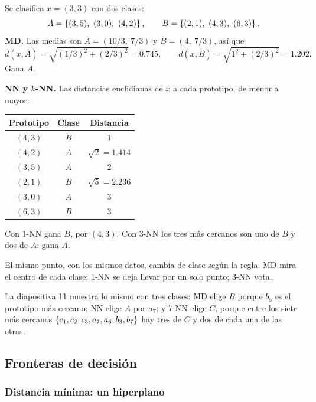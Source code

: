\documentclass[11pt,letterpaper]{article}
\begin{document}
\begin{ejemplo}
    Se clasifica $x = (3, 3)$ con dos clases:
    \[
        A = \set{(3, 5),\ (3, 0),\ (4, 2)} , \qquad
        B = \set{(2, 1),\ (4, 3),\ (6, 3)} .
    \]
    \textbf{MD.} Las medias son $\bar{A} = (10/3,\ 7/3)$ y
    $\bar{B} = (4,\ 7/3)$, así que
    \[
        d(x, \bar{A}) = \sqrt{(1/3)^2 + (2/3)^2} = 0.745 , \qquad
        d(x, \bar{B}) = \sqrt{1^2 + (2/3)^2} = 1.202 .
    \]
    Gana $A$.

    \textbf{NN y $k$-NN.} Las distancias euclidianas de $x$ a cada
    prototipo, de menor a mayor:
    \begin{center}
    \begin{tabular}{ccc}
        \toprule
        \textbf{Prototipo} & \textbf{Clase} & \textbf{Distancia} \\
        \midrule
        $(4, 3)$ & $B$ & $1$ \\
        $(4, 2)$ & $A$ & $\sqrt{2} = 1.414$ \\
        $(3, 5)$ & $A$ & $2$ \\
        $(2, 1)$ & $B$ & $\sqrt{5} = 2.236$ \\
        $(3, 0)$ & $A$ & $3$ \\
        $(6, 3)$ & $B$ & $3$ \\
        \bottomrule
    \end{tabular}
    \end{center}
    Con 1-NN gana $B$, por $(4, 3)$. Con 3-NN los tres más cercanos
    son uno de $B$ y dos de $A$: gana $A$.

    El mismo punto, con los mismos datos, cambia de clase según la
    regla. MD mira el centro de cada clase; 1-NN se deja llevar por un
    solo punto; 3-NN vota.
\end{ejemplo}

La diapositiva 11 muestra lo mismo con tres clases: MD elige $B$
porque $b_5$ es el prototipo más cercano; NN elige $A$ por $a_7$; y
7-NN elige $C$, porque entre los siete más cercanos
$\left\{ c_1, c_2, c_3, a_7, a_6, b_3, b_7 \right\}$ hay tres de $C$ y dos de
cada una de las otras.


\subsection*{Fronteras de decisión}

\subsubsection*{Distancia mínima: un hiperplano}
\end{document}
